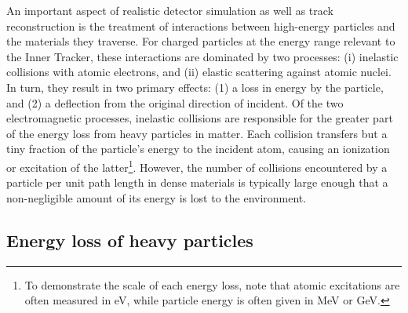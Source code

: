 An important aspect of realistic detector simulation as well as track reconstruction is the treatment of interactions between high-energy particles and the materials they traverse. 
For charged particles at the energy range relevant to the Inner Tracker, these interactions are dominated by two processes: (i) inelastic collisions with atomic electrons, and (ii) elastic scattering against atomic nuclei. 
In turn, they result in two primary effects: (1) a loss in energy by the particle, and (2) a deflection from the original direction of incident.  
Of the two electromagnetic processes, inelastic collisions are responsible for the greater part of the energy loss from heavy particles in matter. 
Each collision transfers but a tiny fraction of the particle's energy to the incident atom, causing an ionization or excitation of the latter\footnote{To demonstrate the scale of each energy loss, note that atomic excitations are often measured in eV, while particle energy is often given in MeV or GeV.}. 
However, the number of collisions encountered by a particle per unit path length in dense materials is typically large enough that a non-negligible amount of its energy is lost to the environment. 

\subsection{Energy loss of heavy particles}\label{subsect:e-loss-heavy}

